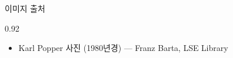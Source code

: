 \begin{frame}{이미지 출처}
\begin{center}\begin{varwidth}{0.92\textwidth}
  \scriptsize
  \begin{itemize}
    \item Karl Popper 사진 (1980년경) --- Franz Barta, LSE Library
  \end{itemize}
\end{varwidth}\end{center}
\end{frame}
